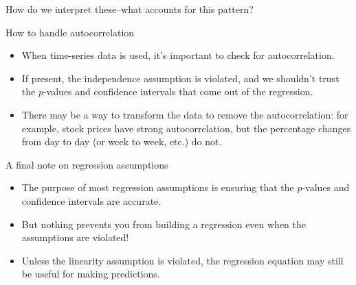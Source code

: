 \documentclass{beamer}\usepackage[]{graphicx}\usepackage[]{color}
\newenvironment{knitrout}{}{} %
\begin{document}
\begin{darkframes}
\begin{frame}[fragile]
\begin{knitrout}
\end{knitrout}

      How do we interpret these--what accounts for this pattern?
    \end{frame}

    \begin{frame}
\begin{knitrout}


\end{knitrout}
    \end{frame}

    \begin{frame}{How to handle autocorrelation}
      \begin{itemize}[<+->]
        \item When time-series data is used, it's important to check for autocorrelation.
        \item If present, the independence assumption is violated, and we shouldn't trust the $p$-values and confidence intervals that come out of the regression.
        \item There may be a way to transform the data to remove the autocorrelation: for example, stock prices have strong autocorrelation, but the percentage changes from day to day (or week to week, etc.) do not.
      \end{itemize}
    \end{frame}

    \begin{frame}{A final note on regression assumptions}
      \begin{itemize}[<+->]
        \item The purpose of most regression assumptions is ensuring that the $p$-values and confidence intervals are accurate.
        \item But nothing prevents you from building a regression even when the assumptions are violated!
        \item Unless the linearity assumption is violated, the regression equation may still be useful for making predictions.
      \end{itemize}
    \end{frame}

  \end{darkframes}
\end{document}
